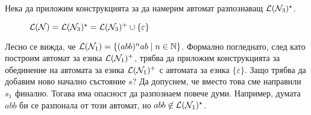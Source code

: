 \begin{example}
  Нека да приложим конструкцията за да намерим автомат разпознаващ $\mathcal{L}(\mathcal{N}_3)^\star$.

  \begin{figure}[H]
    \label{subf:a1}
    \center
    \caption{$\mathcal{L}(\mathcal{N}) = \mathcal{L}(\mathcal{N}_3)^\star = \mathcal{L}(\mathcal{N}_3)^+ \cup \{\varepsilon\}$}
  \end{figure}
    
  Лесно се вижда, че $\mathcal{L}(\mathcal{N}_1) = \{(abb)^nab\mid n\in\mathbb{N}\}$.
  Формално погледнато, след като построим автомат за езика $\mathcal{L}(\mathcal{N}_1)^+$, трябва да приложим
  конструкцията за обединение на автомата за езика $\mathcal{L}(\mathcal{N}_1)^+$ с автомата за езика $\{\varepsilon\}$.
  Защо трябва да добавим ново начално състояние $s$?
  Да допуснем, че вместо това сме направили $s_1$ финално.
  Тогава има опасност да разпознаем повече думи. Например, думата $abb$ би се разпонала от този автомат,
  но $abb \not\in\mathcal{L}(\mathcal{N}_1)^\star$.
  
\end{example}



